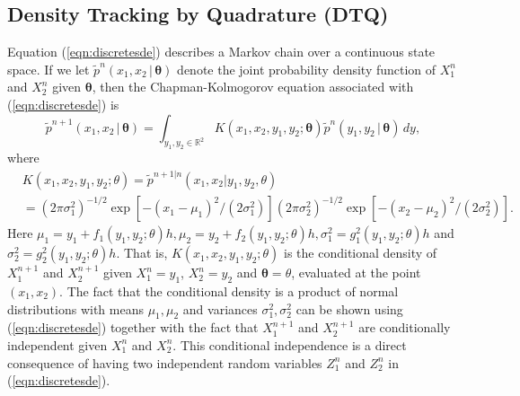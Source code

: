 \documentclass[graybox]{svmult}
\newcommand{\btheta}{\ensuremath{\boldsymbol{\theta}}}
\begin{document}
\subsection{Density Tracking by Quadrature (DTQ)}
\label{subsec:2-1}
Equation (\ref{eqn:discretesde}) describes a Markov chain over a continuous state space.  If we let $\widetilde{p}^n(x_1,x_2 \, | \, \btheta)$ denote the joint probability density function of $X_1^n$ and $X_2^n$ given $\btheta$, then the Chapman-Kolmogorov equation associated with (\ref{eqn:discretesde})  is
\begin{equation}
\label{eqn:chapman}
\widetilde{p}^{n+1}(x_1,x_2 \, | \, \btheta) = \int_{y_1,y_2 \in \mathbb{R}^2} K(x_1,x_2,y_1,y_2; \btheta) \widetilde{p}^n(y_1,y_2 \, | \, \btheta) \, dy,
\end{equation}
where
\begin{align}
&K(x_1,x_2,y_1,y_2; \theta) = \widetilde{p}^{{n+1} | {n}}(x_1,x_2 | y_1,y_2,\theta) \nonumber\\
&= (2 \pi \sigma_1^2)^{-1/2} \exp \left[ -(x_1 - \mu_1)^2/(2 \sigma_1^2) \right] (2 \pi \sigma_2^2)^{-1/2} \exp \left[ -(x_2 - \mu_2)^2/(2 \sigma_2^2) \right]\nonumber.
\end{align}
Here $\mu_1 = y_1 + f_1(y_1,y_2; \theta) h,  \mu_2 = y_2 + f_2(y_1,y_2; \theta) h,  \sigma_1^2 = g_1^2(y_1,y_2; \theta) h$ and  $\sigma_2^2 = g_2^2(y_1,y_2; \theta) h$. That is, $K(x_1,x_2,y_1,y_2; \theta)$ is the conditional density of $X_1^{n+1}$ and $X_2^{n+1}$ given $X_1^n = y_1$, $X_2^n = y_2$ and $\btheta = \theta$, evaluated at the point $(x_1,x_2)$.  The fact that the conditional density is a product of normal distributions with means $\mu_1, \mu_2$ and variances $\sigma_1^2, \sigma_2^2$ can be shown using (\ref{eqn:discretesde}) together with the fact that $X_1^{n+1}$ and $X_2^{n+1}$ are conditionally independent given $X_1^n$ and $X_2^n$. This conditional independence is a direct consequence of having two independent random variables $Z_1^n$ and $Z_2^n$ in (\ref{eqn:discretesde}).
\end{document}

